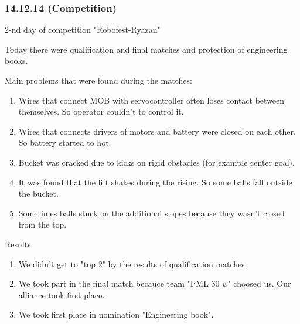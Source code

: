 \subsubsection{14.12.14 (Competition)}
\begin{center}
	2-nd day of competition "Robofest-Ryazan"
\end{center}
Today there were qualification and final matches and protection of engineering books.
\newline 

Main problems that were found during the matches:
\begin{enumerate}
	\item Wires that connect MOB with servocontroller often loses contact between themselves. So operator couldn't to control it.
	
	\item Wires that connects drivers of motors and battery were closed on each other. So battery started to hot.
	
	\item Bucket was cracked due to kicks on rigid obstacles (for example center goal).
	
	\item It was found that the lift shakes during the rising. So some balls fall outside the bucket.
	
	\item Sometimes balls stuck on the additional slopes because they wasn't closed from the top.
	
\end{enumerate}

Results:
\begin{enumerate}
	\item We didn't get to "top 2" by the results of qualification matches.
	
	\item We took part in the final match becauce team "PML 30 ${\psi}$" choosed us. Our alliance took first place.
	
	\item We took first place in nomination "Engineering book".
\end{enumerate}

